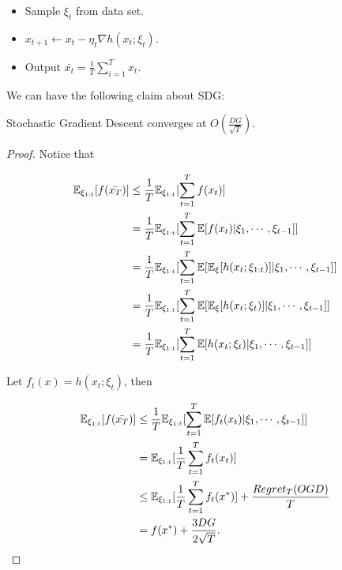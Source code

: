\documentclass[../main.tex]{subfiles}
\begin{document}
\begin{itemize}
	\item Sample $\xi_t$ from data set.
	\item $x_{t+1} \leftarrow x_t - \eta_t \nabla h(x_t; \xi_t)$.
	\item Output $\bar{x_t} = \frac{1}{T} \sum\limits_{i=1}^T x_t$.
\end{itemize}

We can have the following claim about SDG:

\begin{claim}
	Stochastic Gradient Descent converges at $O(\frac{DG}{\sqrt{T}})$.
\end{claim}

\begin{proof}
	Notice that
	
	\begin{equation*}
		\begin{aligned}
			\mathbb{E}_{\xi_{1:t}} [f(\bar{x_T})] &\leq \frac{1}{T} \mathbb{E}_{\xi_{1:t}} [ \sum\limits_{t=1}^T f(x_t)] \\
			&  = \frac{1}{T} \mathbb{E}_{\xi_{1:t}} [ \sum\limits_{t=1}^T  \mathbb{E}[f(x_t)|\xi_1, \cdots , \xi_{t-1} ]]  \\ 
			&  = \frac{1}{T} \mathbb{E}_{\xi_{1:t}} [ \sum\limits_{t=1}^T  \mathbb{E}[ \mathbb{E}_{\xi}[h(x_t;\xi_{1:t})]|\xi_1, \cdots , \xi_{t-1} ]]  \\
			&  = \frac{1}{T} \mathbb{E}_{\xi_{1:t}} [ \sum\limits_{t=1}^T  \mathbb{E}[ \mathbb{E}_{\xi}[h(x_t;\xi_{t})]|\xi_1, \cdots , \xi_{t-1} ]]  \\
			&  = \frac{1}{T} \mathbb{E}_{\xi_{1:t}} [ \sum\limits_{t=1}^T  \mathbb{E}[ h(x_t;\xi_{t})|\xi_1, \cdots , \xi_{t-1} ]]  \\
		\end{aligned}
	\end{equation*}
	
	Let $f_t(x) = h(x_t;\xi_t)$, then 
	
	\begin{equation*}
	\begin{aligned}
	\mathbb{E}_{\xi_{1:t}} [f(\bar{x_T})] & \leq \frac{1}{T} \mathbb{E}_{\xi_{1:t}} [ \sum\limits_{t=1}^T  \mathbb{E}[ f_t(x_t)|\xi_1, \cdots , \xi_{t-1} ]]  \\ 
	&= \mathbb{E}_{\xi_{1:t}} [\frac{1}{T} \sum\limits_{t=1}^T  f_t(x_t)] \\
	& \leq \mathbb{E}_{\xi_{1:t}} [\frac{1}{T} \sum\limits_{t=1}^T  f_t(x^*)] + \frac{Regret_T(OGD)}{T} \\
	& = f(x^*) + \frac{3DG}{2\sqrt{T}}.
	\end{aligned}
	\end{equation*}
\end{proof}
\end{document}
